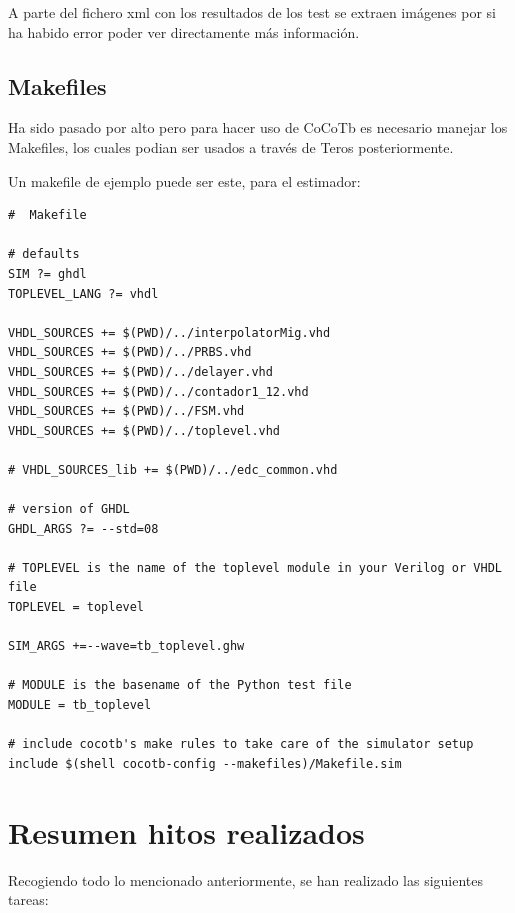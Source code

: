 \documentclass[11pt]{scrartcl} %
\begin{document}
\begin{preview}
A parte del fichero xml con los resultados de los test se extraen imágenes por si ha habido error poder ver directamente más información.

\subsection{Makefiles}

Ha sido pasado por alto pero para hacer uso de CoCoTb es necesario manejar los Makefiles, los cuales podian ser usados a través de Teros posteriormente.

Un makefile de ejemplo puede ser este, para el estimador:

\begin{verbatim}
#  Makefile

# defaults
SIM ?= ghdl
TOPLEVEL_LANG ?= vhdl

VHDL_SOURCES += $(PWD)/../interpolatorMig.vhd
VHDL_SOURCES += $(PWD)/../PRBS.vhd
VHDL_SOURCES += $(PWD)/../delayer.vhd
VHDL_SOURCES += $(PWD)/../contador1_12.vhd
VHDL_SOURCES += $(PWD)/../FSM.vhd
VHDL_SOURCES += $(PWD)/../toplevel.vhd

# VHDL_SOURCES_lib += $(PWD)/../edc_common.vhd

# version of GHDL
GHDL_ARGS ?= --std=08

# TOPLEVEL is the name of the toplevel module in your Verilog or VHDL file
TOPLEVEL = toplevel

SIM_ARGS +=--wave=tb_toplevel.ghw

# MODULE is the basename of the Python test file
MODULE = tb_toplevel

# include cocotb's make rules to take care of the simulator setup
include $(shell cocotb-config --makefiles)/Makefile.sim
\end{verbatim}

\Newpage

\section{Resumen hitos realizados}

Recogiendo todo lo mencionado anteriormente, se han realizado las siguientes tareas:


\end{preview}
\end{document}
